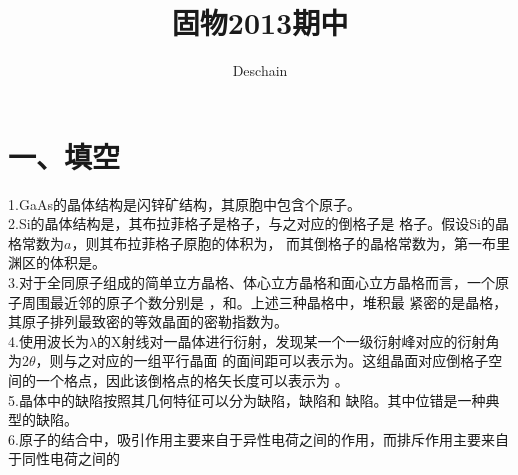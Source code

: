 \documentclass[UTF8]{ctexart}
\title{固物2013期中}
\author{Deschain}
\begin{document}
\maketitle
\section*{\bfseries 一、填空}
1.GaAs的晶体结构是闪锌矿结构，其原胞中包含\uline{\mbox{\hspace{2em}}}个原子。\\
2.Si的晶体结构是\uline{\mbox{\hspace{4em}}}，其布拉菲格子是\uline{\mbox{\hspace{6em}}}格子，与之对应的倒格子是
\uline{\mbox{\hspace{6em}}}格子。假设Si的晶格常数为$a$，则其布拉菲格子原胞的体积为\uline{\mbox{\hspace{3em}}}，
而其倒格子的晶格常数为\uline{\mbox{\hspace{3em}}}，第一布里渊区的体积是\uline{\mbox{\hspace{5em}}}。\\
3.对于全同原子组成的简单立方晶格、体心立方晶格和面心立方晶格而言，一个原子周围最近邻的原子个数分别是
\uline{\mbox{\hspace{2em}}}，\uline{\mbox{\hspace{2em}}}和\uline{\mbox{\hspace{2em}}}。上述三种晶格中，堆积最
紧密的是\uline{\mbox{\hspace{6em}}}晶格，其原子排列最致密的等效晶面的密勒指数为\uline{\mbox{\hspace{5em}}}。\\
4.使用波长为$\lambda$的X射线对一晶体进行衍射，发现某一个一级衍射峰对应的衍射角为$2\theta$，则与之对应的一组平行晶面
的面间距可以表示为\uline{\mbox{\hspace{7em}}}。这组晶面对应倒格子空间的一个格点，因此该倒格点的格矢长度可以表示为
\uline{\mbox{\hspace{9em}}}。\\
5.晶体中的缺陷按照其几何特征可以分为\uline{\mbox{\hspace{2em}}}缺陷，\uline{\mbox{\hspace{2em}}}缺陷和
\uline{\mbox{\hspace{2em}}}缺陷。其中位错是一种典型的\uline{\mbox{\hspace{2em}}}缺陷。\\
6.原子的结合中，吸引作用主要来自于异性电荷之间的\uline{\mbox{\hspace{6em}}}作用，而排斥作用主要来自于同性电荷之间的
\end{document}
